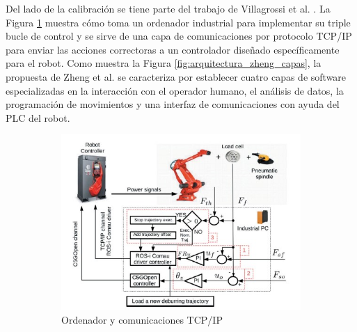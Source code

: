 Del lado de la calibración se tiene parte del trabajo de Villagrossi et al. \cite{Villagrossi2018}. La Figura \ref{fig:arqutiectura_control_villagrossi} muestra cómo toma un ordenador industrial para implementar su triple bucle de control y se sirve de una capa de comunicaciones por protocolo \acrshort{TCP/IP} para enviar las acciones correctoras a un controlador diseñado específicamente para el robot. Como muestra la Figura \ref{fig:arquitectura_zheng_capas}, la propuesta de Zheng et al. \cite{Zheng_2022} se caracteriza por establecer cuatro capas de software especializadas en la interacción con el operador humano, el análisis de datos, la programación de movimientos y una interfaz de comunicaciones con ayuda del \acrshort{PLC} del robot.

    \begin{figure}[h!]
        \centering
         \begin{subfigure}[h]{0.45\linewidth} 
            \centering
            \includegraphics[scale=0.35]{figuras/arqutiectura_control_villagrossi.jpg}
            \caption{Ordenador y comunicaciones \acrshort{TCP/IP} \cite{Villagrossi2018}}
            \label{fig:arqutiectura_control_villagrossi}
        \end{subfigure}
        \begin{subfigure}[h]{0.45\linewidth} 
            \centering

\end{subfigure}
\end{figure}
